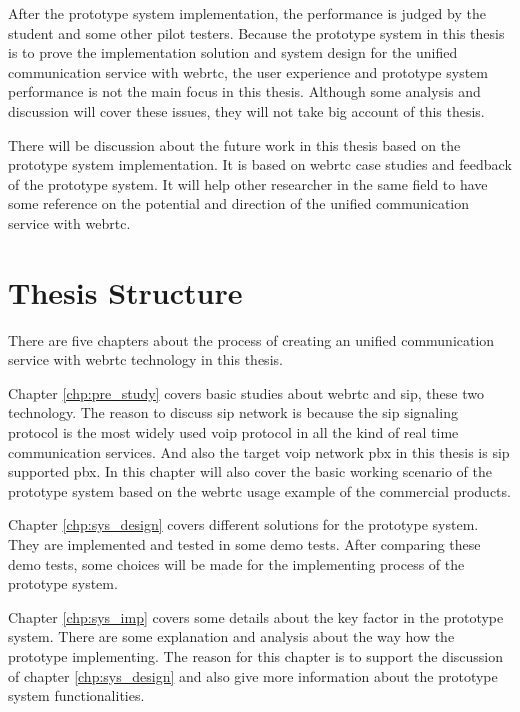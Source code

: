 \par After the prototype system implementation, the performance is judged by the student and some other pilot testers. Because the prototype system in this thesis is to prove the implementation solution and system design for the unified communication service with \gls{webrtc}, the user experience and prototype system performance is not the main focus in this thesis. Although some analysis and discussion will cover these issues, they will not take big account of this thesis.

\par There will be discussion about the future work in this thesis based on the prototype system implementation. It is based on \gls{webrtc} case studies and feedback of the prototype system. It will help other researcher in the same field to have some reference on the potential and direction of the unified communication service with \gls{webrtc}.

\section{Thesis Structure}

\noindent There are five chapters about the process of creating an unified communication service with \gls{webrtc} technology in this thesis.

\par Chapter \ref{chp:pre_study} covers basic studies about \gls{webrtc} and \gls{sip}, these two technology. The reason to discuss \gls{sip} network is because the \gls{sip} signaling protocol is the most widely used \gls{voip} protocol in all the kind of real time communication services. And also the target \gls{voip} network \gls{pbx} in this thesis is \gls{sip} supported \gls{pbx}. In this chapter will also cover the basic working scenario of the prototype system based on the \gls{webrtc} usage example of the commercial products.

\par Chapter \ref{chp:sys_design} covers different solutions for the prototype system. They are implemented and tested in some demo tests. After comparing these demo tests, some choices will be made for the implementing process of the prototype system.

\par Chapter \ref{chp:sys_imp} covers some details about the key factor in the prototype system. There are some explanation and analysis about the way how the prototype implementing. The reason for this chapter is to support the discussion of chapter \ref{chp:sys_design} and also give more information about the prototype system functionalities.

